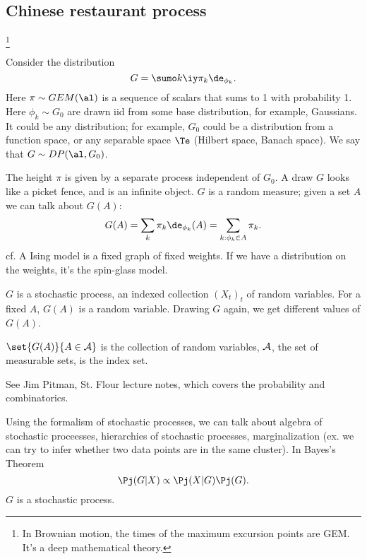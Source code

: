 \subsection{Chinese restaurant process}

\footnote{In Brownian motion, the times of the maximum excursion points are GEM. It's a deep mathematical theory.}

Consider the distribution
$$
G=\sumo k{\iy} \pi_k \de_{\phi_k}.
$$
Here $\pi\sim GEM(\al)$ is a sequence of scalars that sums to 1 with probability 1. 
Here $\phi_k\sim G_0$ are drawn iid from some base distribution, for example, Gaussians.
It could be any distribution; for example, $G_0$ could be a distribution from a function space, or any separable space $\Te$ (Hilbert space, Banach space).
We say that $G\sim DP(\al,G_0)$.

The height  $\pi$ is given by a separate process independent of $G_0$. A draw $G$ looks like a picket fence, and is an infinite object. $G$ is a random measure; given a set $A$ we can talk about $G(A)$:
$$
G(A) = \sum_k \pi_k \de_{\phi_k}(A) = \sum_{k:\phi_k\in A}\pi_k.
$$
cf. A Ising model is a fixed graph of fixed weights. If we have a distribution on the weights, it's the spin-glass model.

$G$ is a stochastic process, an indexed collection $(X_t)_t$ of random variables. %
For a fixed $A$, $G(A)$ is a random variable. Drawing $G$ again, we get different values of $G(A)$.

$\set{G(A)}{A\in \cal A}$ is the collection of random variables, $\cal A$, the set of measurable sets, is the index set.
%

See Jim Pitman, St. Flour lecture notes, which covers the probability and combinatorics.


Using the formalism of stochastic processes, we can talk about algebra of stochastic proceesses, hierarchies of stochastic processes, marginalization (ex. we can try to infer whether two data points are in the same cluster).
In Bayes's Theorem $$\Pj(G|X)\propto \Pj(X|G)\Pj(G).$$
$G$ is a stochastic process.


